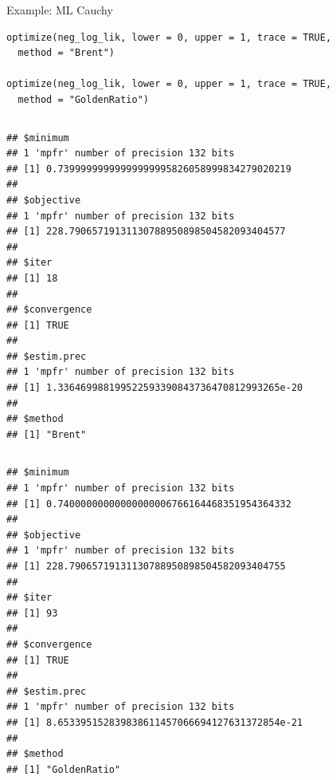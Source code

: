 \documentclass[11pt,compress,t,notes=noshow, xcolor=table]{beamer}
\begin{document}
\begin{vbframe}{Example: ML Cauchy}
\begin{verbatim}
optimize(neg_log_lik, lower = 0, upper = 1, trace = TRUE, 
  method = "Brent")

optimize(neg_log_lik, lower = 0, upper = 1, trace = TRUE, 
  method = "GoldenRatio")

\end{verbatim}







\framebreak 






\vspace*{-1cm}

\begin{columns}
\begin{column}{1\textwidth}
\begin{verbatim}
## $minimum
## 1 'mpfr' number of precision 132 bits
## [1] 0.73999999999999999995826058999834279020219
##
## $objective
## 1 'mpfr' number of precision 132 bits
## [1] 228.79065719131130788950898504582093404577
##
## $iter
## [1] 18
##
## $convergence
## [1] TRUE
##
## $estim.prec
## 1 'mpfr' number of precision 132 bits
## [1] 1.336469988199522593390843736470812993265e-20
##
## $method
## [1] "Brent"
\end{verbatim}
\end{column}
\end{columns}

\framebreak

\vspace*{-1cm}

\begin{columns}
\begin{column}{1\textwidth}
\begin{verbatim}
## $minimum
## 1 'mpfr' number of precision 132 bits
## [1] 0.74000000000000000006766164468351954364332
##
## $objective
## 1 'mpfr' number of precision 132 bits
## [1] 228.79065719131130788950898504582093404755
##
## $iter
## [1] 93
##
## $convergence
## [1] TRUE
##
## $estim.prec
## 1 'mpfr' number of precision 132 bits
## [1] 8.653395152839838611457066694127631372854e-21
##
## $method
## [1] "GoldenRatio"
\end{verbatim}

\end{column}
\end{columns}

\end{vbframe}
\endlecture
\end{document}
